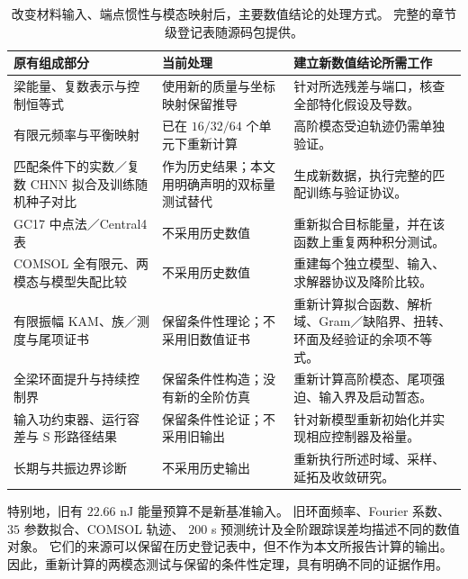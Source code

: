 \begin{table}[t]
\centering
\caption{改变材料输入、端点惯性与模态映射后，主要数值结论的处理方式。
完整的章节级登记表随源码包提供。}
\label{sx:migration-table}
\begin{tabular}{p{}p{}p{}}
\toprule
原有组成部分 & 当前处理 & 建立新数值结论所需工作\\
\midrule
梁能量、复数表示与控制恒等式 & 使用新的质量与坐标映射保留推导 & 针对所选残差与端口，核查全部特化假设及导数。\\
有限元频率与平衡映射 & 已在 $16/32/64$ 个单元下重新计算 & 高阶模态受迫轨迹仍需单独验证。\\
匹配条件下的实数／复数 CHNN 拟合及训练随机种子对比 & 作为历史结果；本文用明确声明的双标量测试替代 & 生成新数据，执行完整的匹配训练与验证协议。\\
GC17 中点法／Central4 表 & 不采用历史数值 & 重新拟合目标能量，并在该函数上重复两种积分测试。\\
COMSOL 全有限元、两模态与模型失配比较 & 不采用历史数值 & 重建每个独立模型、输入、求解器协议及降阶比较。\\
有限振幅 KAM、族／测度与尾项证书 & 保留条件性理论；不采用旧数值证书 & 重新计算拟合函数、解析域、Gram／缺陷界、扭转、环面及经验证的余项不等式。\\
全梁环面提升与持续控制界 & 保留条件性构造；没有新的全阶仿真 & 重新计算高阶模态、尾项强迫、输入界及启动暂态。\\
输入功约束器、运行容差与 S 形路径结果 & 保留条件性论证；不采用旧输出 & 针对新模型重新初始化并实现相应控制器及裕量。\\
长期与共振边界诊断 & 不采用历史输出 & 重新执行所述时域、采样、延拓及收敛研究。\\
\bottomrule
\end{tabular}
\end{table}

特别地，旧有 $22.66$ nJ 能量预算不是新基准输入。
旧环面频率、Fourier 系数、$35$ 参数拟合、COMSOL 轨迹、
$200$ s 预测统计及全阶跟踪误差均描述不同的数值对象。
它们的来源可以保留在历史登记表中，但不作为本文所报告计算的输出。
因此，重新计算的两模态测试与保留的条件性定理，具有明确不同的证据作用。
